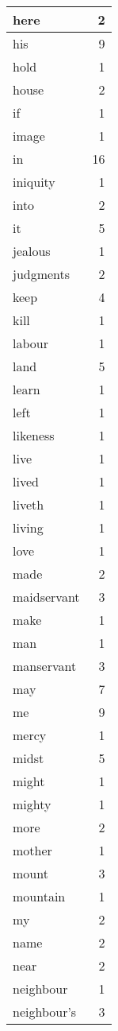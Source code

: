 \begin{center}
\begin{longtable}{l|r}
here & 2 \\ \hline
his & 9 \\ \hline
hold & 1 \\ \hline
house & 2 \\ \hline
if & 1 \\ \hline
image & 1 \\ \hline
in & 16 \\ \hline
iniquity & 1 \\ \hline
into & 2 \\ \hline
it & 5 \\ \hline
jealous & 1 \\ \hline
judgments & 2 \\ \hline
keep & 4 \\ \hline
kill & 1 \\ \hline
labour & 1 \\ \hline
land & 5 \\ \hline
learn & 1 \\ \hline
left & 1 \\ \hline
likeness & 1 \\ \hline
live & 1 \\ \hline
lived & 1 \\ \hline
liveth & 1 \\ \hline
living & 1 \\ \hline
love & 1 \\ \hline
made & 2 \\ \hline
maidservant & 3 \\ \hline
make & 1 \\ \hline
man & 1 \\ \hline
manservant & 3 \\ \hline
may & 7 \\ \hline
me & 9 \\ \hline
mercy & 1 \\ \hline
midst & 5 \\ \hline
might & 1 \\ \hline
mighty & 1 \\ \hline
more & 2 \\ \hline
mother & 1 \\ \hline
mount & 3 \\ \hline
mountain & 1 \\ \hline
my & 2 \\ \hline
name & 2 \\ \hline
near & 2 \\ \hline
neighbour & 1 \\ \hline
neighbour's & 3 \\ \hline

\end{longtable}
\end{center}
